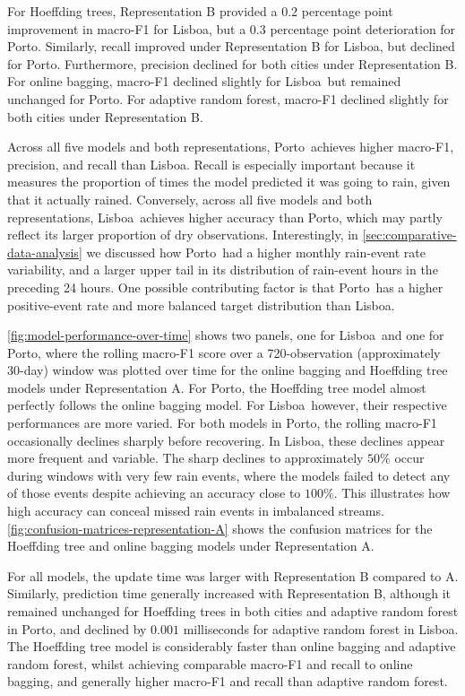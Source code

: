 \documentclass[11pt,a4paper]{article}
\newcommand{\CityA}{Lisboa}
\newcommand{\CityB}{Porto}
\begin{document}
	For Hoeffding trees, Representation B provided a $0.2$ percentage point improvement in macro-F1 for \CityA, but a $0.3$ percentage point deterioration for \CityB. Similarly, recall improved under Representation B for \CityA, but declined for \CityB. Furthermore, precision declined for both cities under Representation B. For online bagging, macro-F1 declined slightly for \CityA\ but remained unchanged for \CityB. For adaptive random forest, macro-F1 declined slightly for both cities under Representation B.
	
	Across all five models and both representations, \CityB\ achieves higher macro-F1, precision, and recall than \CityA. Recall is especially important because it measures the proportion of times the model predicted it was going to rain, given that it actually rained. Conversely, across all five models and both representations, \CityA\ achieves higher accuracy than \CityB, which may partly reflect its larger proportion of dry observations. Interestingly, in \autoref{sec:comparative-data-analysis} we discussed how \CityB\ had a higher monthly rain-event rate variability, and a larger upper tail in its distribution of rain-event hours in the preceding 24 hours. One possible contributing factor is that \CityB\ has a higher positive-event rate and more balanced target distribution than \CityA.
	
	\autoref{fig:model-performance-over-time} shows two panels, one for \CityA\ and one for \CityB, where the rolling macro-F1 score over a 720-observation (approximately 30-day) window was plotted over time for the online bagging and Hoeffding tree models under Representation A. For \CityB, the Hoeffding tree model almost perfectly follows the online bagging model. For \CityA\, however, their respective performances are more varied. For both models in \CityB, the rolling macro-F1 occasionally declines sharply before recovering. In \CityA, these declines appear more frequent and variable. The sharp declines to approximately $50\%$ occur during windows with very few rain events, where the models failed to detect any of those events despite achieving an accuracy close to $100\%$. This illustrates how high accuracy can conceal missed rain events in imbalanced streams. \autoref{fig:confusion-matrices-representation-A} shows the confusion matrices for the Hoeffding tree and online bagging models under Representation A.
	
	For all models, the update time was larger with Representation B compared to A. Similarly, prediction time generally increased with Representation B, although it remained unchanged for Hoeffding trees in both cities and adaptive random forest in \CityB, and declined by $0.001$ milliseconds for adaptive random forest in \CityA. The Hoeffding tree model is considerably faster than online bagging and adaptive random forest, whilst achieving comparable macro-F1 and recall to online bagging, and generally higher macro-F1 and recall than adaptive random forest.
	
\end{document}
